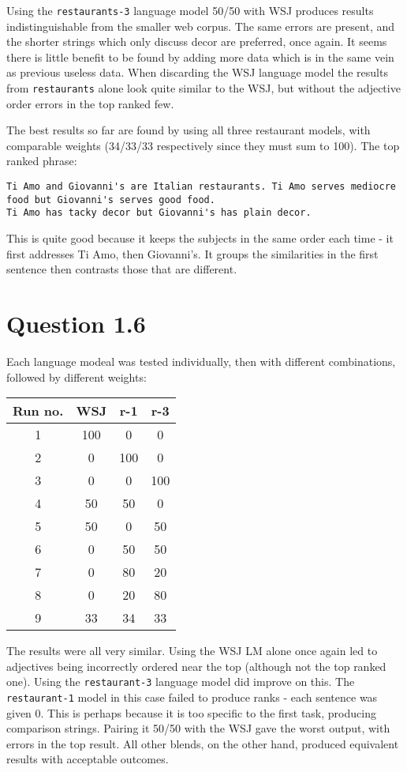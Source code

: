 \documentclass[a4paper,11pt,oneside]{article}
\begin{document}
Using the \verb+restaurants-3+ language model 50/50 with WSJ produces results indistinguishable from the smaller web corpus. The same errors are present, and the shorter strings which only discuss decor are preferred, once again. It seems there is little benefit to be found by adding more data which is in the same vein as previous useless data. When discarding the WSJ language model the results from \verb+restaurants+ alone look quite similar to the WSJ, but without the adjective order errors in the top ranked few.

The best results so far are found by using all three restaurant models, with comparable weights (34/33/33 respectively since they must sum to 100). The top ranked phrase:

\begin{verbatim}
Ti Amo and Giovanni's are Italian restaurants. Ti Amo serves mediocre food but Giovanni's serves good food. 
Ti Amo has tacky decor but Giovanni's has plain decor. 
\end{verbatim}

This is quite good because it keeps the subjects in the same order each time - it first addresses Ti Amo, then Giovanni's. It groups the similarities in the first sentence then contrasts those that are different.

\section{Question 1.6}

Each language modeal was tested individually, then with different combinations, followed by different weights:
    
\begin{tabular}{ | c | c | c | c | }
  \hline                        
  Run no. & WSJ & r-1 & r-3 \\ \hline
  1 & 100 & 0 & 0 \\
  2 & 0 & 100 & 0 \\
  3 & 0 & 0 & 100 \\
  4 & 50 & 50 & 0 \\
  5 & 50 & 0 & 50 \\
  6 & 0 & 50 & 50 \\
  7 & 0 & 80 & 20 \\
  8 & 0 & 20 & 80 \\
  9 & 33 & 34 & 33 \\
  \hline  
\end{tabular}

The results were all very similar. Using the WSJ LM alone once again led to adjectives being incorrectly ordered near the top (although not the top ranked one). Using the \verb+restaurant-3+ language model did improve on this. The \verb+restaurant-1+ model in this case failed to produce ranks - each sentence was given 0. This is perhaps because it is too specific to the first task, producing comparison strings. Pairing it 50/50 with the WSJ gave the worst output, with errors in the top result. All other blends, on the other hand, produced equivalent results with acceptable outcomes. 
\end{document}
